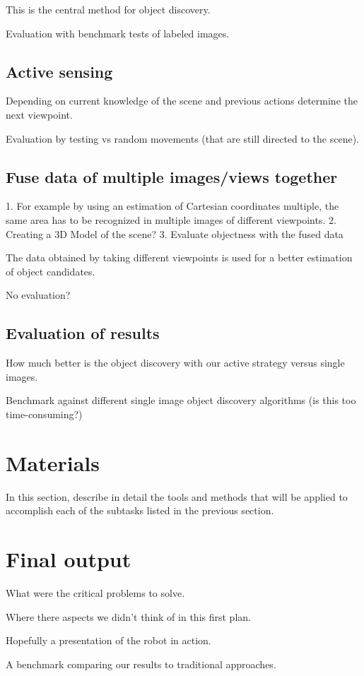 \documentclass[a4paper,11pt,english]{article}
\begin{document}
This is the central method for object discovery.

Evaluation with benchmark tests of labeled images.

\subsection{Active sensing}
Depending on current knowledge of the scene and previous actions determine the next viewpoint.

Evaluation by testing vs random movements (that are still directed to the scene).

\subsection{Fuse data of multiple images/views together}
1. For example by using an estimation of Cartesian coordinates multiple, the same area has to be recognized in multiple images of different viewpoints.
2. Creating a 3D Model of the scene?
3. Evaluate objectness with the fused data

The data obtained by taking different viewpoints is used for a better estimation of object candidates.

No evaluation?

\subsection{Evaluation of results}
How much better is the object discovery with our active strategy versus single images.

Benchmark against different single image object discovery algorithms (is this too time-consuming?)

\section{Materials}
In this section, describe in detail the tools and methods that will be applied to accomplish each of the subtasks listed in the previous section.

\section{Final output}
What were the critical problems to solve.

Where there aspects we didn't think of in this first plan.

Hopefully a presentation of the robot in action.

A benchmark comparing our results to traditional approaches. 


\newpage


\end{document}
